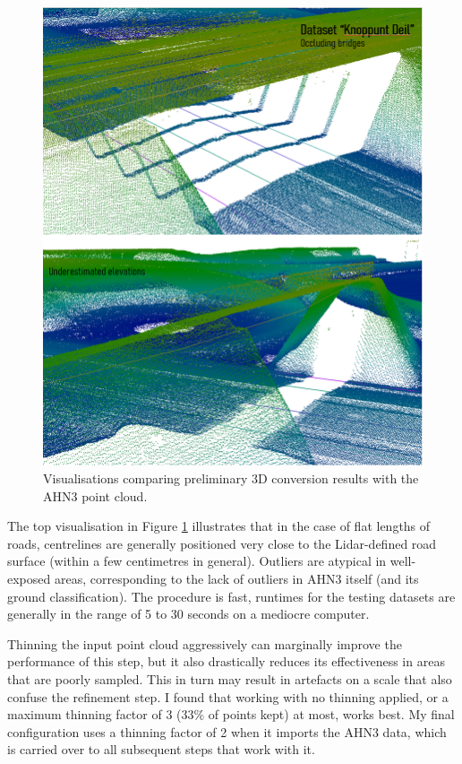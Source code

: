 \begin{figure}[]
    \centering
    \includegraphics[width=0.9\linewidth]{final_report/figs/elevationestimation2.png}
    \caption{Visualisations comparing preliminary 3D conversion results with the AHN3 point cloud.}
    \label{fig:elevationestimation2}
\end{figure}

The top visualisation in Figure \ref{fig:elevationestimation2} illustrates that in the case of flat lengths of roads, centrelines are generally positioned very close to the Lidar-defined road surface (within a few centimetres in general). Outliers are atypical in well-exposed areas, corresponding to the lack of outliers in AHN3 itself (and its ground classification). The procedure is fast, runtimes for the testing datasets are generally in the range of 5 to 30 seconds on a mediocre computer.

Thinning the input point cloud aggressively can marginally improve the performance of this step, but it also drastically reduces its effectiveness in areas that are poorly sampled. This in turn may result in artefacts on a scale that also confuse the refinement step. I found that working with no thinning applied, or a maximum thinning factor of 3 (33\% of points kept) at most, works best. My final configuration uses a thinning factor of 2 when it imports the AHN3 data, which is carried over to all subsequent steps that work with it.

